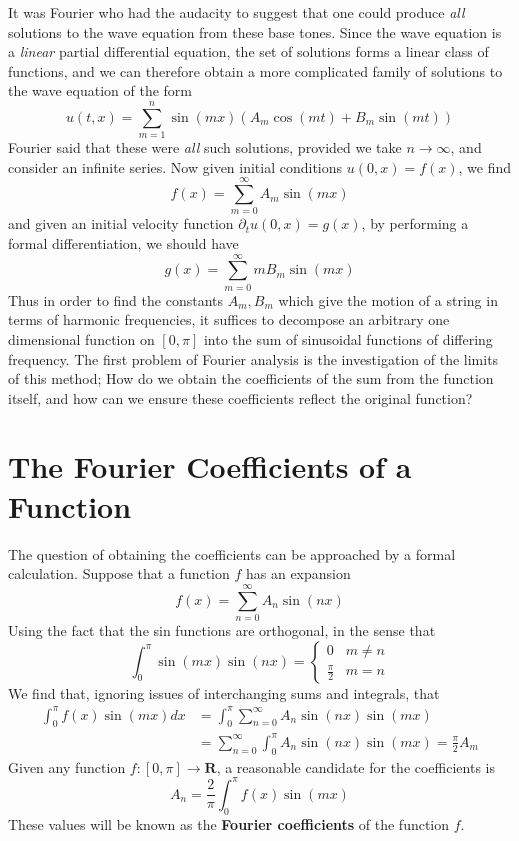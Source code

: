 It was Fourier who had the audacity to suggest that one could produce {\it all} solutions to the wave equation from these base tones. Since the wave equation is a {\it linear} partial differential equation, the set of solutions forms a linear class of functions, and we can therefore obtain a more complicated family of solutions to the wave equation of the form
%
\[ u(t,x) = \sum_{m = 1}^n \sin(mx) (A_m \cos(mt) + B_m \sin(mt)) \]
%
Fourier said that these were {\it all} such solutions, provided we take $n \to \infty$, and consider an infinite series. Now given initial conditions $u(0,x) = f(x)$, we find
%
\[ f(x) = \sum_{m = 0}^\infty A_m \sin(mx) \]
%
and given an initial velocity function $\partial_t u(0,x) = g(x)$, by performing a formal differentiation, we should have
%
\[ g(x) = \sum_{m = 0}^\infty m B_m \sin(mx) \]
%
Thus in order to find the constants $A_m,B_m$ which give the motion of a string in terms of harmonic frequencies, it suffices to decompose an arbitrary one dimensional function on $[0,\pi]$ into the sum of sinusoidal functions of differing frequency. The first problem of Fourier analysis is the investigation of the limits of this method; How do we obtain the coefficients of the sum from the function itself, and how can we ensure these coefficients reflect the original function?

\section{The Fourier Coefficients of a Function}

The question of obtaining the coefficients can be approached by a formal calculation. Suppose that a function $f$ has an expansion
%
\[ f(x) = \sum_{n = 0}^\infty A_n \sin(nx) \]
%
Using the fact that the sin functions are orthogonal, in the sense that
%
\[ \int_0^\pi \sin(mx) \sin(nx) = \begin{cases} 0 & m \neq n \\ \frac{\pi}{2} & m = n \end{cases} \]
%
We find that, ignoring issues of interchanging sums and integrals, that
%
\begin{align*}
    \int_0^\pi f(x) \sin(mx) dx &= \int_0^\pi \sum_{n = 0}^\infty A_n \sin(nx) \sin(mx)\\
    &= \sum_{n = 0}^\infty \int_0^\pi A_n \sin(nx) \sin(mx) = \frac{\pi}{2} A_m
\end{align*}
%
Given any function $f:[0,\pi] \to \mathbf{R}$, a reasonable candidate for the coefficients is
%
\[ A_n = \frac{2}{\pi} \int_0^\pi f(x) \sin(mx) \]
%
These values will be known as the {\bf Fourier coefficients} of the function $f$.

